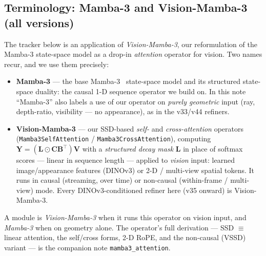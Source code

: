\documentclass[11pt,a4paper]{article}
\begin{document}
\subsection{Terminology: Mamba-3 and Vision-Mamba-3 (all versions)}
\label{sec:vmamba3-def}
The tracker below is an application of \emph{Vision-Mamba-3}, our reformulation of the Mamba-3 state-space
model as a drop-in \emph{attention} operator for vision. Two names recur, and we use them precisely:
\begin{itemize}
  \item \textbf{Mamba-3} --- the base Mamba-3~\cite{mamba3} state-space model and its structured state-space
  duality: the causal 1-D sequence operator we build on. In this note ``Mamba-3'' also labels a use of our
  operator on \emph{purely geometric} input (ray, depth-ratio, visibility --- no appearance), as in the
  v33/v44 refiners.
  \item \textbf{Vision-Mamba-3} --- our SSD-based \emph{self-} and \emph{cross-attention} operators
  (\texttt{Mamba3SelfAttention} / \texttt{Mamba3CrossAttention}), computing
  $\bm{Y}=(\bm{L}\odot\bm{C}\bm{B}^{\top})\bm{V}$ with a \emph{structured decay mask} $\bm{L}$ in place of
  softmax scores --- linear in sequence length --- applied to \emph{vision} input: learned image/appearance
  features (DINOv3) or 2-D / multi-view spatial tokens. It runs in causal (streaming, over time) or
  non-causal (within-frame / multi-view) mode. Every DINOv3-conditioned refiner here (v35 onward) is
  Vision-Mamba-3.
\end{itemize}
A module is \emph{Vision-Mamba-3} when it runs this operator on vision input, and \emph{Mamba-3} when on
geometry alone. The operator's full derivation --- SSD $\equiv$ linear attention, the self/cross forms,
2-D RoPE, and the non-causal (VSSD) variant --- is the companion note \texttt{mamba3\_attention}.
\end{document}
